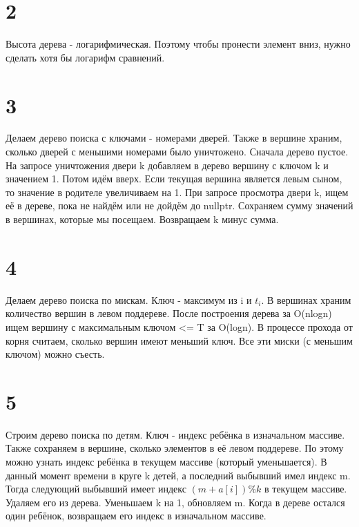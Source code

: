 \documentclass[12pt]{extarticle}
\begin{document}
\section*{2}
Высота дерева - логарифмическая. Поэтому чтобы пронести элемент вниз, нужно сделать хотя бы логарифм сравнений.

\section*{3}
Делаем дерево поиска с ключами - номерами дверей. Также в вершине храним, сколько дверей с меньшими номерами было уничтожено.
\newline
Сначала дерево пустое. На запросе уничтожения двери k добавляем в дерево вершину с ключом k и значением 1. Потом идём вверх. Если текущая вершина является левым сыном, то значение в родителе увеличиваем на 1.
\newline
При запросе просмотра двери k, ищем её в дереве, пока не найдём или не дойдём до nullptr. Сохраняем сумму значений в вершинах, которые мы посещаем. Возвращаем k минус сумма.

\section*{4}
Делаем дерево поиска по мискам. Ключ - максимум из i и $t_i$. В вершинах храним количество вершин в левом поддереве.
\newline
После построения дерева за O(nlogn) ищем вершину с максимальным ключом <= T за O(logn). В процессе прохода от корня считаем, сколько вершин имеют меньший ключ. Все эти миски (с меньшим ключом) можно съесть.


\section*{5}
Строим дерево поиска по детям. Ключ - индекс ребёнка в изначальном массиве. Также сохраняем в вершине, сколько элементов в её левом поддереве. По этому можно узнать индекс ребёнка в текущем массиве (который уменьшается).
\newline
В данный момент времени в круге k детей, а последний выбывший имел индекс m. Тогда следующий выбывший имеет индекс $(m + a[i]) \% k$ в текущем массиве. Удаляем его из дерева. Уменьшаем k на 1, обновляем m.
\newline
Когда в дереве остался один ребёнок, возвращаем его индекс в изначальном массиве.
\end{document}
